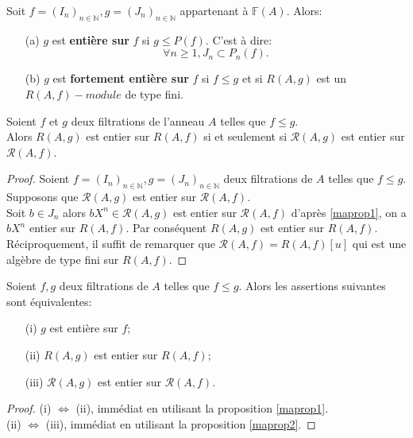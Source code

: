 \begin{madefinition}
	Soit $f=(I_n)_{n \in \mathbb{N}} , g = (J_n)_{n \in \mathbb{N}}$ appartenant à $ \mathbb{F}(A)$.  Alors:\\
	\begin{enumerate}
		\item[(a)]$g$ est \textbf{entière sur} $f$ si $g \leqslant P(f)$. C'est à dire:
		\[\forall n \geqslant 1, J_n \subset P_{n}(f). \]
		\item[(b)]$g$ est \textbf{fortement entière sur} $f$ si $f \leqslant g$ et si $R(A,g)$ est un $R(A,f)-module$ de type fini.
	\end{enumerate}
\end{madefinition}
\begin{maproposition}
	\label{maprop2}
	Soient $f$ et $g$ deux filtrations de l'anneau $A$ telles que $f \leqslant g$.\\ Alors $R(A,g)$ est entier sur $R(A,f)$ si et seulement si $\mathcal{R}(A,g)$ est entier sur $\mathcal{R}(A,f)$. 
\end{maproposition}
\begin{proof}
	Soient $f=(I_n)_{n \in \mathbb{N}},g=(J_n)_{n \in \mathbb{N}}$ deux filtrations de $A$ telles que $f \leqslant g$. \\ Supposons que $\mathcal{R}(A,g)$ est entier sur $\mathcal{R}(A,f)$. \\
	Soit $b \in J_n$ alors $bX^n \in \mathcal{R}(A,g)$ est entier sur $\mathcal{R}(A,f)$ d'après \ref{maprop1}, on a $bX^n$ entier sur $R(A,f)$. Par conséquent $R(A,g)$ est entier sur $R(A,f)$.
	Réciproquement, il suffit de remarquer que $\mathcal{R}(A,f)=R(A,f)[u]$ qui est une algèbre de type fini sur $R(A,f)$.
\end{proof}
\begin{maproposition}
	Soient $f,g$ deux filtrations de $A$ telles que $f \leqslant g$. Alors les assertions suivantes sont équivalentes:
	\begin{enumerate}
		\item[(i)] $g$ est entière sur $f$;
		\item[(ii)] $R(A,g)$ est entier sur $R(A,f)$;
		\item[(iii)] $\mathcal{R}(A,g)$ est entier sur $\mathcal{R}(A,f)$.
	\end{enumerate}
\end{maproposition}
\begin{proof}
	(i) $\Longleftrightarrow$ (ii), immédiat en utilisant la proposition \ref{maprop1}. \\
	(ii) $\Longleftrightarrow$ (iii), immédiat en utilisant la proposition \ref{maprop2}.
\end{proof}
